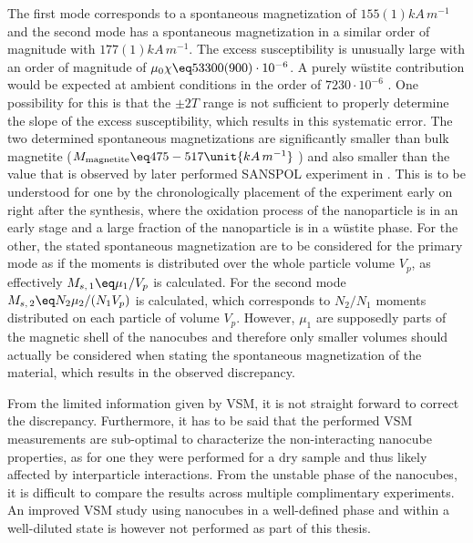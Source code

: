 \documentclass[\main/dresen_thesis.tex]{subfiles}
\begin{document}
  The first mode corresponds to a spontaneous magnetization of $155(1) \unit{kA \, m^{-1}}$ and the second mode has a spontaneous magnetization in a similar order of magnitude with $177(1) \unit{kA \, m^{-1}}$.
  The excess susceptibility is unusually large with an order of magnitude of $\mu_0 \chi \eq 53300(900) \cdot 10^{-6}$.
  A purely w\"ustite contribution would be expected at ambient conditions in the order of $7230 \cdot 10^{-6}$ \cite{Lide_2004_Handb}.
  One possibility for this is that the $\pm 2 \unit{T}$ range is not sufficient to properly determine the slope of the excess susceptibility, which results in this systematic error.
  The two determined spontaneous magnetizations are significantly smaller than bulk magnetite ($M_\mathrm{magnetite} \eq 475 - 517 \unit{kA \, m^{-1}}$ \cite{Cornell_2003_Their, Handley_2000_Moder}) and also smaller than the value that is observed by later performed SANSPOL experiment in .
  This is to be understood for one by the chronologically placement of the experiment early on right after the synthesis, where the oxidation process of the nanoparticle is in an early stage and a large fraction of the nanoparticle is in a w\"ustite phase.
  For the other, the stated spontaneous magnetization are to be considered for the primary mode as if the moments is distributed over the whole particle volume $V_p$, as effectively $M_{s,\,1} \eq \mu_1 / V_p$ is calculated.
  For the second mode $M_{s,\,2} \eq N_2 \mu_2 / (N_1 V_p)$ is calculated, which corresponds to $N_2/N_1$ moments distributed on each particle of volume $V_p$.
  However, $\mu_1$ are supposedly parts of the magnetic shell of the nanocubes and therefore only smaller volumes should actually be considered when stating the spontaneous magnetization of the material, which results in the observed discrepancy.

  From the limited information given by VSM, it is not straight forward to correct the discrepancy.
  Furthermore, it has to be said that the performed VSM measurements are sub-optimal to characterize the non-interacting nanocube properties, as for one they were performed for a dry sample and thus likely affected by interparticle interactions.
  From the unstable phase of the nanocubes, it is difficult to compare the results across multiple complimentary experiments.
  An improved VSM study using nanocubes in a well-defined phase and within a well-diluted state is however not performed as part of this thesis.
\end{document}

